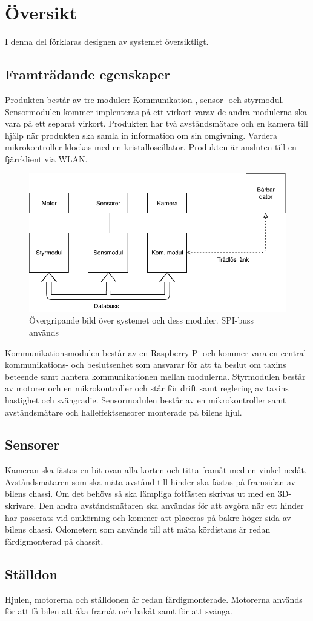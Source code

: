 \documentclass[designspec/spec.tex]{subfiles}
\begin{document}
\section{Översikt}
I denna del förklaras designen av systemet översiktligt.

\subsection{Framträdande egenskaper}
Produkten består av tre moduler: Kommunikation-, sensor- och styrmodul.
Sensormodulen kommer implenteras på ett virkort varav de andra modulerna ska
vara på ett separat virkort. Produkten har två avståndsmätare och en kamera
till hjälp när produkten ska samla in information om sin omgivning. Vardera
mikrokontroller klockas med en kristalloscillator. Produkten är ansluten till en
fjärrklient via WLAN.

\begin{figure}[h]
    \centering
    \includegraphics[width=0.65\linewidth]{designspec/fig/blockskiss.pdf}
    \caption{Övergripande bild över systemet och dess moduler. SPI-buss används}
    \label{fig:overview}
\end{figure}
\noindent
Kommunikationsmodulen består av en Raspberry Pi och kommer vara en central
kommun\-ikations- och beslutsenhet som ansvarar för att ta beslut om taxins
beteende samt hantera kommunikationen mellan modulerna. Styrmodulen består av
motorer och en mikrokontroller och står för drift samt reglering av taxins
hastighet och svängradie. Sensormodulen består av en mikrokontroller samt
avståndsmätare och halleffektsensorer monterade på bilens hjul.

\subsection{Sensorer}
Kameran ska fästas en bit ovan alla korten och titta framåt med en vinkel
nedåt. Avståndsmätaren som ska mäta avstånd till hinder ska fästas på framsidan
av bilens chassi. Om det behövs så ska lämpliga fotfästen skrivas ut med en
3D-skrivare. Den andra avståndsmätaren ska användas för att avgöra när ett
hinder har passerats vid omkörning och kommer att placeras på bakre höger sida
av bilens chassi. Odometern som används till att mäta kördistans är redan
färdigmonterad på chassit.

\subsection{Ställdon}
Hjulen, motorerna och ställdonen är redan färdigmonterade. Motorerna används
för att få bilen att åka framåt och bakåt samt för att svänga.
\end{document}
